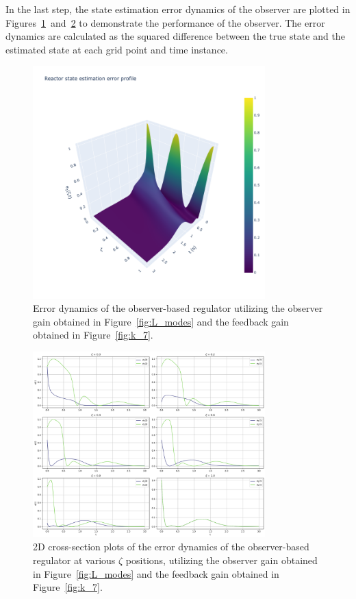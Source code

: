 In the last step, the state estimation error dynamics of the observer are plotted in Figures~\ref{fig:3D_e1_L_k7}~and~\ref{fig:2D_et_L_k7} to demonstrate the performance of the observer. The error dynamics are calculated as the squared difference between the true state and the estimated state at each grid point and time instance.

\begin{figure}[!htbp]
    \centering
    \includegraphics[width=0.8\textwidth,trim=0 0 100 0,clip]{Figures/3D_e1_L_k7.png}
    \caption{Error dynamics of the observer-based regulator utilizing the observer gain obtained in Figure~\ref{fig:L_modes} and the feedback gain obtained in Figure~\ref{fig:k_7}.}
    \label{fig:3D_e1_L_k7}
\end{figure}

\begin{figure}[!htbp]
    \centering
    \includegraphics[width=0.8\textwidth]{Figures/2D_et_L_k7.png}
    \caption{2D cross-section plots of the error dynamics of the observer-based regulator at various $\zeta$ positions, utilizing the observer gain obtained in Figure~\ref{fig:L_modes} and the feedback gain obtained in Figure~\ref{fig:k_7}.}
    \label{fig:2D_et_L_k7}
\end{figure}

